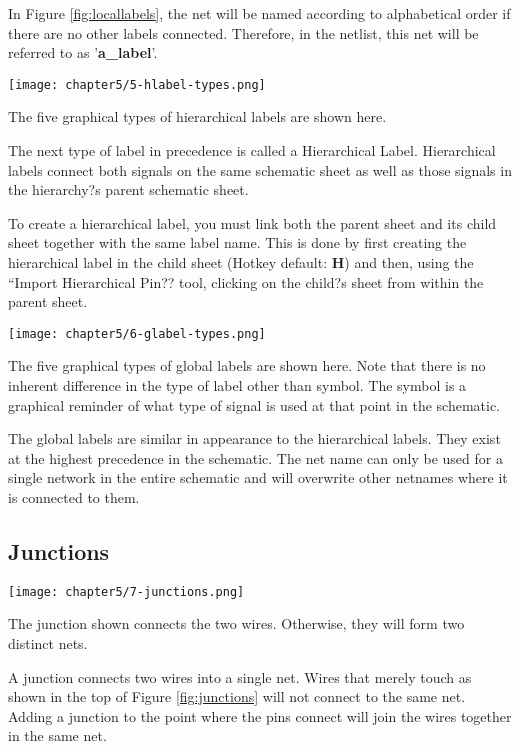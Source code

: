 In Figure \ref{fig:locallabels}, the net will be named according to alphabetical order if there are no other labels connected.
Therefore, in the netlist, this net will be referred to as '\textbf{a\_label}'.

\begin{marginfigure}
	\texttt{[image: chapter5/5-hlabel-types.png]}
	\caption[Hierarchical Labels]{
		The five graphical types of hierarchical labels are shown here.
	}
	\label{fig:hlabel-types}
\end{marginfigure}
The next type of label in precedence is called a Hierarchical Label.
Hierarchical labels connect both signals on the same schematic sheet as well as those signals in the hierarchy?s parent schematic sheet.

To create a hierarchical label, you must link both the parent sheet and its child sheet together with the same label name.
This is done by first creating the hierarchical label in the child sheet (Hotkey default: \textbf{H}) and then, using the ``Import Hierarchical Pin?? tool, clicking on the child?s sheet from within the parent sheet.

\begin{marginfigure}
	\texttt{[image: chapter5/6-glabel-types.png]}
	\caption[Global Labels]{
		The five graphical types of global labels are shown here.
		Note that there is no inherent difference in the type of label other than symbol.
		The symbol is a graphical reminder of what type of signal is used at that point in the schematic.
	}
	\label{fig:glabel-types}
\end{marginfigure}
The global labels are similar in appearance to the hierarchical labels.
They exist at the highest precedence in the schematic.
The net name can only be used for a single network in the entire schematic and will overwrite other netnames where it is connected to them.

\subsection{Junctions}
\begin{marginfigure}
	\texttt{[image: chapter5/7-junctions.png]}
	\caption[Wires with and without a junction]{
		The junction shown connects the two wires.
		Otherwise, they will form two distinct nets.
	}
	\label{fig:junctions}
\end{marginfigure}
A junction connects two wires into a single net.
Wires that merely touch as shown in the top of Figure \ref{fig:junctions} will not connect to the same net.
Adding a junction to the point where the pins connect will join the wires together in the same net.


